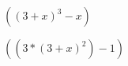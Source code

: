 \documentclass{proc}
\begin{document}
$( ( 3 + x ) ^ 3 - x ) $

$( ( 3 * ( 3 + x ) ^ 2 ) - 1 ) $
\end{document}
